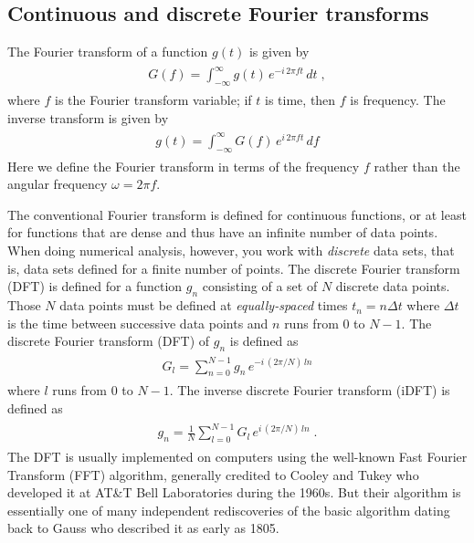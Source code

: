 \documentclass[letterpaper,10pt,english]{sphinxmanual}
\begin{document}
\subsection{Continuous and discrete Fourier transforms}
\label{chap9/chap9_scipy:continuous-and-discrete-fourier-transforms}
The Fourier transform of a function \(g(t)\) is given by
\label{chap9/chap9_scipy:equation-eq:FT}\begin{gather}
\begin{split} G(f) = \int_{-\infty}^\infty g(t)\, e^{-i\, 2\pi f t}\, dt \;,\end{split}\label{chap9/chap9_scipy-eq:FT}
\end{gather}
where \(f\) is the Fourier transform variable; if \(t\) is time, then \(f\) is frequency.  The inverse transform is given by
\label{chap9/chap9_scipy:equation-eq:iFT}\begin{gather}
\begin{split} g(t) = \int_{-\infty}^\infty G(f)\, e^{i\, 2\pi ft}\, df\end{split}\label{chap9/chap9_scipy-eq:iFT}
\end{gather}
Here we define the Fourier transform in terms of the frequency \(f\) rather than the angular frequency \(\omega = 2\pi f\).

The conventional Fourier transform is defined for continuous functions, or at least for functions that are dense and thus have an infinite number of data points.  When doing numerical analysis, however, you work with \emph{discrete} data sets, that is, data sets defined for a finite number of points.  The discrete Fourier transform (DFT) is defined for a function \(g_n\) consisting of a set of \(N\) discrete data points.  Those \(N\) data points must be defined at \emph{equally-spaced} times \(t_n=n\Delta t\) where \(\Delta t\) is the time between successive data points and \(n\) runs from 0 to \(N-1\).  The discrete Fourier transform (DFT) of \(g_n\) is defined as
\label{chap9/chap9_scipy:equation-eq:DFT}\begin{gather}
\begin{split}G_l = \sum_{n=0}^{N-1} g_n\, e^{-i\,(2\pi/N)\,ln}\end{split}\label{chap9/chap9_scipy-eq:DFT}
\end{gather}
where \(l\) runs from 0 to \(N-1\).  The inverse discrete Fourier transform (iDFT) is defined as
\label{chap9/chap9_scipy:equation-eq:iDFT}\begin{gather}
\begin{split}g_n = \frac{1}{N} \sum_{l=0}^{N-1} G_l\, e^{i\,(2\pi/N)\,ln} \;.\end{split}\label{chap9/chap9_scipy-eq:iDFT}
\end{gather}
The DFT is usually implemented on computers using the well-known Fast Fourier Transform (FFT) algorithm, generally credited to Cooley and Tukey who developed it at AT\&T Bell Laboratories during the 1960s.  But their algorithm is essentially one of many independent rediscoveries of the basic algorithm dating back to Gauss who described it as early as 1805.
\end{document}
